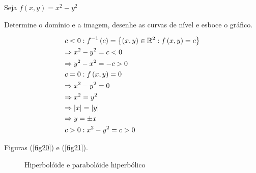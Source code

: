 \documentclass{book}
\begin{document}
\begin{ex}
Seja $f\left( {x,y} \right) = x^2 - y^2$

Determine o dom\'inio e a imagem, desenhe as curvas de n\'ivel e esboce o gr\'afico.
\end{ex}

\newpage 

\begin{sol}
\[
\begin{gathered}
  c < 0:f^{ - 1} \left( c \right) = \left\{ {\left( {x,y} \right) \in \R^2 :f\left( {x,y} \right) = c} \right\} \hfill \\
\Rightarrow x^2  - y^2  = c < 0 \hfill \\
\Rightarrow y^2  - x^2  =  - c > 0 \hfill \\
c = 0:f\left( {x,y} \right) = 0 \hfill \\
\Rightarrow x^2  - y^2  = 0 \hfill \\
\Rightarrow x^2  = y^2  \hfill \\
\Rightarrow \left| x \right| = \left| y \right| \hfill \\
\Rightarrow y =  \pm x \hfill \\
c > 0:x^2  - y^2  = c > 0 \hfill \\
\end{gathered}
\]

Figuras (\ref{fig20}) e (\ref{fig21}).

\begin{figure}[!h]
  \centering
  \quad
  \caption{Hiperbol\'oide e parabol\'oide hiperb\'olico}
\end{figure}

\end{sol}
\end{document}
